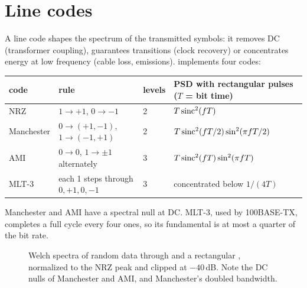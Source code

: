 \section{Line codes}\label{sec:line-codes}
A line code shapes the spectrum of the transmitted symbols: it removes DC (transformer
coupling), guarantees transitions (clock recovery) or concentrates energy at low frequency
(cable loss, emissions).  implements four codes:
\begin{center}\small
\begin{tabular}{@{}llll@{}}
\toprule
code & rule & levels & PSD with rectangular pulses ($T$ = bit time)\\
\midrule
NRZ & $1\to+1$, $0\to-1$ & 2 & $T\operatorname{sinc}^2(fT)$\\
Manchester & $0\to(+1,-1)$, $1\to(-1,+1)$ & 2 & $T\operatorname{sinc}^2(fT/2)\sin^2(\pi fT/2)$\\
AMI & $0\to0$, $1\to\pm1$ alternately & 3 & $T\operatorname{sinc}^2(fT)\sin^2(\pi fT)$\\
MLT-3 & each 1 steps through $0,+1,0,-1$ & 3 & concentrated below $1/(4T)$\\
\bottomrule
\end{tabular}
\end{center}
Manchester and AMI have a spectral null at DC. MLT-3, used by 100BASE-TX, completes a full
cycle every four ones, so its fundamental is at most a quarter of the bit rate.

\begin{figure}[htbp]
\centering
{}
\caption{Welch spectra of random data through  and a rectangular
, normalized to the NRZ peak and clipped at $-40$\,dB. Note the DC nulls of
Manchester and AMI, and Manchester's doubled bandwidth.}
\label{fig:linecode-psd}
\end{figure}


